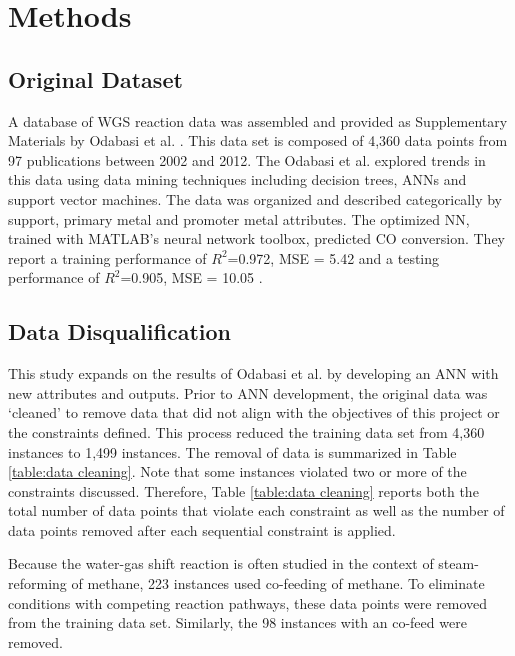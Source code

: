 \chapter{Methods}
\label{ch:methods}


\section{Original Dataset} 

A database of WGS reaction data was assembled and provided as Supplementary Materials by Odabasi et al. \cite{Odabasi_2014}. This data set is composed of 4,360 data points from 97 publications between 2002 and 2012. The Odabasi et al. explored trends in this data using data mining techniques including decision trees, ANNs and support vector machines. The data was organized and described categorically by support, primary metal and promoter metal attributes. The optimized NN, trained with MATLAB's neural network toolbox, predicted CO conversion. They report a training performance of $R^2$=0.972, MSE = 5.42 and a testing performance of $R^2$=0.905, MSE = 10.05 \cite{Odabasi_2014}. 

\section{Data Disqualification}
This study expands on the results of Odabasi et al. by developing an ANN with new attributes and outputs. Prior to ANN development, the original data was `cleaned' to remove data that did not align with the objectives of this project or the constraints defined. This process reduced the training data set from 4,360 instances to 1,499 instances. The removal of data is summarized in Table \ref{table:data cleaning}. Note that some instances violated two or more of the constraints discussed. Therefore, Table \ref{table:data cleaning} reports both the total number of data points that violate each constraint as well as the number of data points removed after each sequential constraint is applied. 

Because the water-gas shift reaction is often studied in the context of steam-reforming of methane, 223 instances used co-feeding of methane. To eliminate conditions with competing reaction pathways, these data points were removed from the training data set. Similarly, the 98 instances with an  co-feed were removed. 

